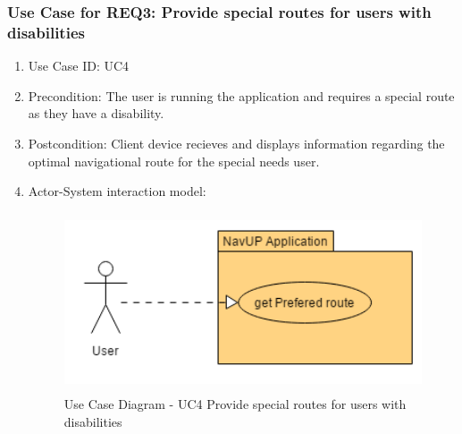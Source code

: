 		\subsubsection{Use Case for REQ3: Provide special routes for users with disabilities}
			\begin{enumerate}
			\renewcommand{\labelenumi}{{\textbf{\arabic{enumi}.}}}
			\item Use Case ID: UC4
			\item Precondition: The user is running the application and requires a special route as they have a disability.
			\item Postcondition: Client device recieves and displays information regarding the optimal navigational route for the special needs user.
			\item Actor-System interaction model:
				\graphicspath{ {./Diagrams/User/} }
				\begin{figure}[h]
				\caption{Use Case Diagram - UC4  Provide special routes for users with disabilities}
				\includegraphics[height = 200px]{getPreferedRoute.png}
				\end{figure}
			\end{enumerate}

